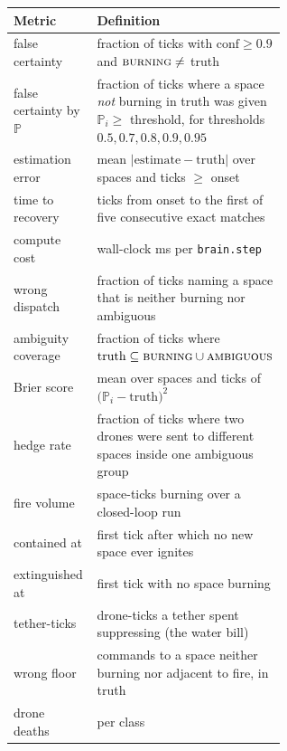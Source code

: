 \documentclass[11pt]{article}
\begin{document}
\begin{center}
\renewcommand{\arraystretch}{1.12}
\begin{tabular}{@{}l>{\raggedright\arraybackslash}p{0.60\linewidth}@{}}
\toprule
\textbf{Metric} & \textbf{Definition} \\
\midrule
false certainty        & fraction of ticks with $\mathrm{conf} \ge 0.9$ and $\textsc{burning} \ne$ truth \\
false certainty by $\mathbb{P}$ & fraction of ticks where a space \emph{not} burning in truth was given $\mathbb{P}_i \ge$ threshold, for thresholds $0.5, 0.7, 0.8, 0.9, 0.95$ \\
estimation error       & mean $|\text{estimate} - \text{truth}|$ over spaces and ticks $\ge$ onset \\
time to recovery       & ticks from onset to the first of five consecutive exact matches \\
compute cost           & wall-clock ms per \texttt{brain.step} \\
wrong dispatch         & fraction of ticks naming a space that is neither burning nor ambiguous \\
ambiguity coverage     & fraction of ticks where $\text{truth} \subseteq \textsc{burning} \cup \textsc{ambiguous}$ \\
Brier score            & mean over spaces and ticks of $\bigl(\mathbb{P}_i - \text{truth}\bigr)^{2}$ \\
hedge rate             & fraction of ticks where two drones were sent to different spaces inside one ambiguous group \\
\midrule
fire volume            & space-ticks burning over a closed-loop run \\
contained at           & first tick after which no new space ever ignites \\
extinguished at        & first tick with no space burning \\
tether-ticks           & drone-ticks a tether spent suppressing (the water bill) \\
wrong floor            & commands to a space neither burning nor adjacent to fire, in truth \\
drone deaths           & per class \\
\bottomrule
\end{tabular}
\end{center}
\end{document}
